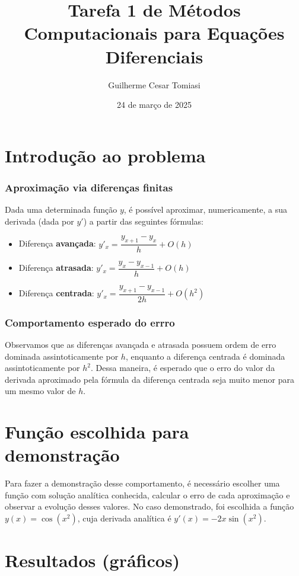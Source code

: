 \documentclass[11pt]{beamer}
\title[T.1. -- MCED]{Tarefa 1 de Métodos Computacionais para Equações Diferenciais}
\author[Tomiasi, G.C.]{Guilherme Cesar Tomiasi\inst{1}}
\institute[UNESP] %
{
  \inst{1}
  Departamento de Matemática e Computação\\
  Universidade Estadual Paulista ``Júlio de Mesquita Filho''
}
\date{24 de março de 2025}
\begin{document}
\frame{\titlepage}

\section{Introdução ao problema}

\begin{frame}
    \frametitle{Aproximação via diferenças finitas}
    
    Dada uma determinada função $y$, é possível aproximar, numericamente, a sua derivada (dada por $y'$) a partir das seguintes fórmulas:
    \begin{itemize}
        \item Diferença \textbf{avançada}: $y'_x = \dfrac{y_{x+1} - y_x}{h} + O(h)$
        \item Diferença \textbf{atrasada}: $y'_x = \dfrac{y_{x} - y_{x-1}}{h} + O(h)$
        \item Diferença \textbf{centrada}: $y'_x = \dfrac{y_{x+1} - y_{x-1}}{2h} + O(h^2)$
    \end{itemize}
\end{frame}

\begin{frame}
    \frametitle{Comportamento esperado do errro}

    Observamos que as diferenças avançada e atrasada possuem ordem de erro dominada assintoticamente por $h$, enquanto a diferença centrada é dominada assintoticamente por $h^2$. Dessa maneira, é esperado que o erro do valor da derivada aproximado pela fórmula da diferença centrada seja muito menor para um mesmo valor de $h$.
\end{frame}

\section{Função escolhida para demonstração}

\begin{frame}
    Para fazer a demonstração desse comportamento, é necessário escolher uma função com solução analítica conhecida, calcular o erro de cada aproximação e observar a evolução desses valores. No caso demonstrado, foi escolhida a função $y(x)=\cos(x^2)$, cuja derivada analítica é $y'(x)=-2x\sin(x^2)$.
\end{frame}

\section{Resultados (gráficos)}
\end{document}
